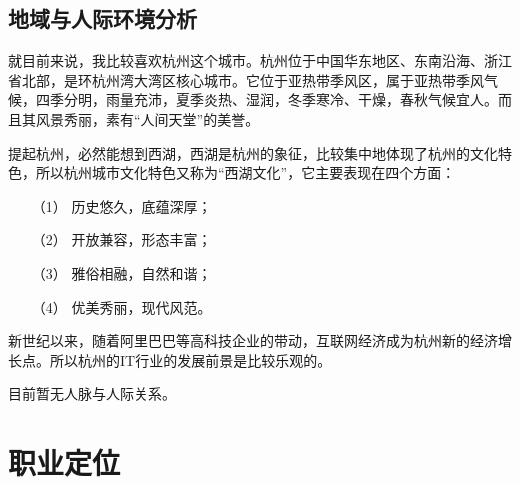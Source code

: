 \documentclass{article}
\begin{document}
\subsection{地域与人际环境分析}
就目前来说，我比较喜欢杭州这个城市。杭州位于中国华东地区、东南沿海、浙江省北部，是环杭州湾大湾区核心城市。它位于亚热带季风区，属于亚热带季风气候，四季分明，雨量充沛，夏季炎热、湿润，冬季寒冷、干燥，春秋气候宜人。而且其风景秀丽，素有“人间天堂”的美誉。\par
提起杭州，必然能想到西湖，西湖是杭州的象征，比较集中地体现了杭州的文化特色，所以杭州城市文化特色又称为“西湖文化”，它主要表现在四个方面：\begin{itemize}
\item[（1）]历史悠久，底蕴深厚；
\item[（2）]开放兼容，形态丰富；
\item[（3）]雅俗相融，自然和谐；
\item[（4）]优美秀丽，现代风范。
\end{itemize}
\par
新世纪以来，随着阿里巴巴等高科技企业的带动，互联网经济成为杭州新的经济增长点。所以杭州的IT行业的发展前景是比较乐观的。\par
目前暂无人脉与人际关系。

\section{职业定位}
\end{document}
